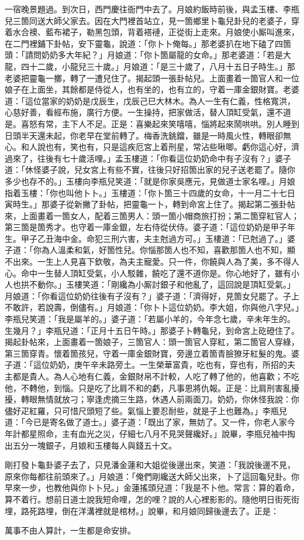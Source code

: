 一宿晚景題過。到次日，西門慶往衙門中去了。月娘約飯時前後，與孟玉樓、李瓶兒三箇同送大師父家去。因在大門裡首站立，見一箇鄉里卜龜兒卦兒的老婆子，穿着水合襖、藍布裙子，勒黑包頭，背着褡褳，正從街上走來。月娘使小厮叫進來，在二門裡鋪下卦帖，安下靈龜，說道：「你卜卜俺每。」那老婆扒在地下磕了四箇頭：「請問奶奶多大年紀？」月娘道：「你卜箇屬龍的女命。」那老婆道：「若是大龍，四十二歲，小龍兒三十歲。」月娘道：「是三十歲了，八月十五日子時生。」那老婆把靈龜一擲，轉了一遭兒住了。揭起頭一張卦帖兒。上面畫着一箇官人和一位娘子在上面坐，其餘都是侍從人，也有坐的，也有立的，守着一庫金銀財寶。老婆道：「這位當家的奶奶是戊辰生，戊辰己巳大林木。為人一生有仁義，性格寬洪，心慈好善，看經布施，廣行方便。一生操持，把家做活，替人頂缸受氣，還不道是。喜怒有常，主下人不足。正是：喜樂起來笑嘻嘻，惱將起來鬧哄哄。別人睡到日頭半天還未起，你老早在堂前轉了。梅香洗銚鐺，雖是一時風火性，轉眼卻無心。和人說也有，笑也有，只是這疾厄宮上着刑星，常沾些啾唧。虧你這心好，濟過來了，往後有七十歲活哩。」孟玉樓道：「你看這位奶奶命中有子沒有？」婆子道：「休怪婆子說，兒女宮上有些不實，往後只好招箇出家的兒子送老罷了。隨你多少也存不的。」玉樓向李瓶兒笑道：「就是你家吳應元，見做道士家名哩。」月娘指着玉樓：「你也叫他卜卜。」玉樓道：「你卜箇三十四歲的女命，十一月二十七日寅時生。」那婆子從新撇了卦帖，把靈龜一卜，轉到命宮上住了。揭起第二張卦帖來，上面畫着一箇女人，配着三箇男人：頭一箇小帽商旅打扮；第二箇穿紅官人；第三箇是箇秀才。也守着一庫金銀，左右侍從伏侍。婆子道：「這位奶奶是甲子年生。甲子乙丑海中金。命犯三刑六害，夫主尅過方可。」玉樓道：「已尅過了。」婆子道：「你為人溫柔和氣，好箇性兒。你惱那箇人也不知，喜歡那箇人也不知，顯不出來。一生上人見喜下欽敬，為夫主寵愛。只一件，你饒與人為了美，多不得人心。命中一生替人頂缸受氣，小人駁雜，饒吃了還不道你是。你心地好了，雖有小人也拱不動你。」玉樓笑道：「剛纔為小厮討銀子和他亂了，這回說是頂缸受氣。」月娘道：「你看這位奶奶往後有子沒有？」婆子道：「濟得好，見箇女兒罷了。子上不敢許，若說壽，倒儘有。」月娘道：「你卜卜這位奶奶。李大姐，你與他八字兒。」李瓶兒笑道：「我是屬羊的。」婆子道：「若屬小羊的，今年念七歲，辛未年生的。生幾月？」李瓶兒道：「正月十五日午時。」那婆子卜轉龜兒，到命宮上矻磴住了。揭起卦帖來，上面畫着一箇娘子，三箇官人：頭一箇官人穿紅，第二箇官人穿綠，第三箇穿青。懷着箇孩兒，守着一庫金銀財寶，旁邊立着箇青臉獠牙紅髮的鬼。{}婆子道：「這位奶奶，庚午辛未路旁土。一生榮華富貴，吃也有，穿也有，所招的夫主都是貴人。為人心地有仁義，金銀財帛不計較，人吃了轉了他的，他喜歡；不吃他，不轉他，到惱。只是吃了比肩不和的虧，凡事恩將仇報。正是：比肩刑害亂擾擾，轉眼無情就放刁；寧逢虎摘三生路，休遇人前兩面刀。奶奶，你休怪我說：你儘好疋紅羅，只可惜尺頭短了些。氣惱上要忍耐些，就是子上也難為。」李瓶兒道：「今已是寄名做了道士。」婆子道：「既出了家，無妨了。又一件，你老人家今年計都星照命，主有血光之災，仔細七八月不見哭聲纔好。」說畢，李瓶兒袖中掏出五分一塊銀子，月娘和玉樓每人與錢五十文。

剛打發卜龜卦婆子去了，只見潘金蓮和大姐從後邊出來，笑道：「我說後邊不見，原來你每都往前頭來了。」月娘道：「俺們剛纔送大師父出來，卜了這回龜兒卦。你早來一步，也教他與你卜卜兒。」金蓮搖頭兒道：「我是不卜他。常言：算的着命，算不着行。想前日道士說我短命哩，怎的哩？說的人心裡影影的。隨他明日街死街埋，路死路埋，倒在洋溝裡就是棺材。」說畢，和月娘同歸後邊去了。正是：

\begin{myquote}
萬事不由人算計，一生都是命安排。
\end{myquote}

